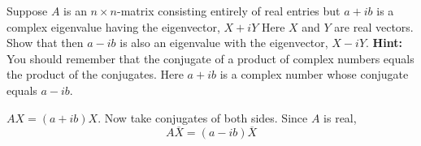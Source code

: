 \begin{ex} Suppose $A$ is an $n\times n$-matrix consisting entirely of real
entries but $a+ib$ is a complex eigenvalue having the eigenvector, $X+iY$ Here $X$ and $Y$ are real vectors. Show
that then $a-ib$ is also an eigenvalue with the eigenvector, $X-iY$. \textbf{Hint: }You should remember that the conjugate of a
product of complex numbers equals the product of the conjugates. Here $a+ib$
is a complex number whose conjugate equals $a-ib$. 
\begin{sol}
 $AX=(
a+ib)X$. Now take conjugates of both sides. Since $A$ is
real,
\[
A\overline{X}=(a-ib) \overline{X}
\]
\end{sol}
\end{ex}

